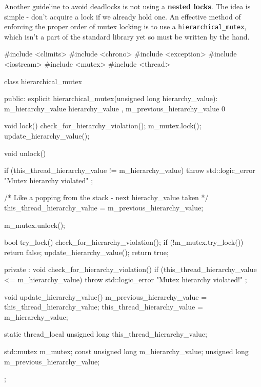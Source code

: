 \documentclass[../main]{subfiles}
\begin{document}
    Another guideline to avoid deadlocks is not using a \textbf{nested locks}. The idea is simple - don't acquire a lock if we already hold one.
An effective method of enforcing the proper order of mutex locking is to use a \texttt{hierarchical\_mutex}, which isn't a part of the standard library yet
so must be written by the hand.
\begin{Code}
    #include <climits>
    #include <chrono>
    #include <exception>
    #include <iostream>
    #include <mutex>
    #include <thread>

    class hierarchical_mutex
    {
    public:
        explicit hierarchical_mutex(unsigned long hierarchy_value):
            m_hierarchy_value { hierarchy_value },
            m_previous_hierarchy_value { 0 }
        {
        }

        void lock()
        {
            check_for_hierarchy_violation();
            m_mutex.lock();
            update_hierarchy_value();
        }

        void unlock()
        {
            if (this_thread_hierarchy_value != m_hierarchy_value)
            {
                throw std::logic_error { "Mutex hierarchy violated" };
            }

            /* Like a popping from the stack - next hierachy_value taken */
            this_thread_hierarchy_value = m_previous_hierarchy_value;

            m_mutex.unlock();
        }

        bool try_lock()
        {
            check_for_hierarchy_violation();
            if (!m_mutex.try_lock())
            {
                return false;
            }
            update_hierarchy_value();
            return true;
        }

    private :
        void check_for_hierarchy_violation()
        {
            if (this_thread_hierarchy_value <= m_hierarchy_value)
            {
                throw std::logic_error { "Mutex hierarchy violated!" };
            }
        }

        void update_hierarchy_value()
        {
            m_previous_hierarchy_value = this_thread_hierarchy_value;
            this_thread_hierarchy_value = m_hierarchy_value;
        }

        static thread_local unsigned long this_thread_hierarchy_value;

        std::mutex m_mutex;
        const unsigned long m_hierarchy_value;
        unsigned long m_previous_hierarchy_value;
    };


\end{Code}
\end{document}
